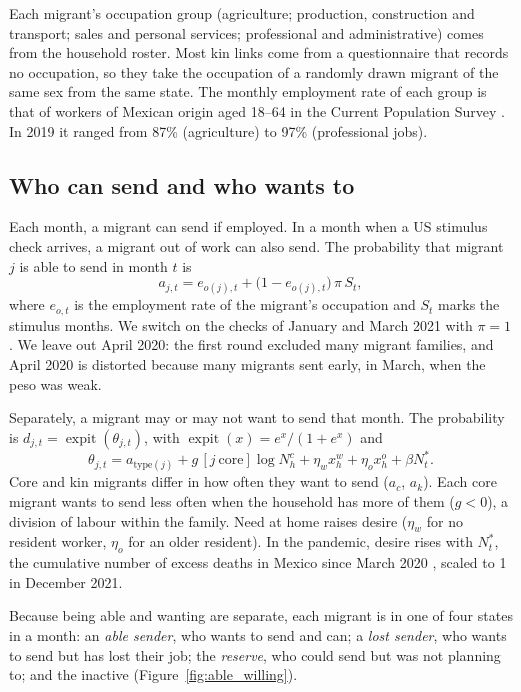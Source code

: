 \documentclass[11pt]{article}
\newcommand{\expit}{\operatorname{expit}}
\begin{document}
Each migrant's occupation group (agriculture; production, construction and transport; sales and personal services; professional and administrative) comes from the household roster. Most kin links come from a questionnaire that records no occupation, so they take the occupation of a randomly drawn migrant of the same sex from the same state. The monthly employment rate of each group is that of workers of Mexican origin aged 18--64 in the Current Population Survey \cite{ipumscps}. In 2019 it ranged from 87\% (agriculture) to 97\% (professional jobs).

\subsection{Who can send and who wants to}

Each month, a migrant can send if employed. In a month when a US stimulus check arrives, a migrant out of work can also send. The probability that migrant $j$ is able to send in month $t$ is
\begin{equation}
a_{j,t} = e_{o(j),t} + \big(1 - e_{o(j),t}\big)\,\pi\,S_t ,
\end{equation}
where $e_{o,t}$ is the employment rate of the migrant's occupation and $S_t$ marks the stimulus months. We switch on the checks of January and March 2021 with $\pi = 1$. We leave out April 2020: the first round excluded many migrant families, and April 2020 is distorted because many migrants sent early, in March, when the peso was weak.

Separately, a migrant may or may not want to send that month. The probability is $d_{j,t} = \expit(\theta_{j,t})$, with $\expit(x) = e^x/(1+e^x)$ and
\begin{equation}
\theta_{j,t} = a_{\mathrm{type}(j)} + g\,[j\ \text{core}]\log N^c_h + \eta_w x^w_h + \eta_o x^o_h + \beta N^*_t .
\end{equation}
Core and kin migrants differ in how often they want to send ($a_c$, $a_k$). Each core migrant wants to send less often when the household has more of them ($g < 0$), a division of labour within the family. Need at home raises desire ($\eta_w$ for no resident worker, $\eta_o$ for an older resident). In the pandemic, desire rises with $N^*_t$, the cumulative number of excess deaths in Mexico since March 2020 \cite{karlinsky2021}, scaled to 1 in December 2021.

Because being able and wanting are separate, each migrant is in one of four states in a month: an \emph{able sender}, who wants to send and can; a \emph{lost sender}, who wants to send but has lost their job; the \emph{reserve}, who could send but was not planning to; and the inactive (Figure~\ref{fig:able_willing}).
\end{document}
